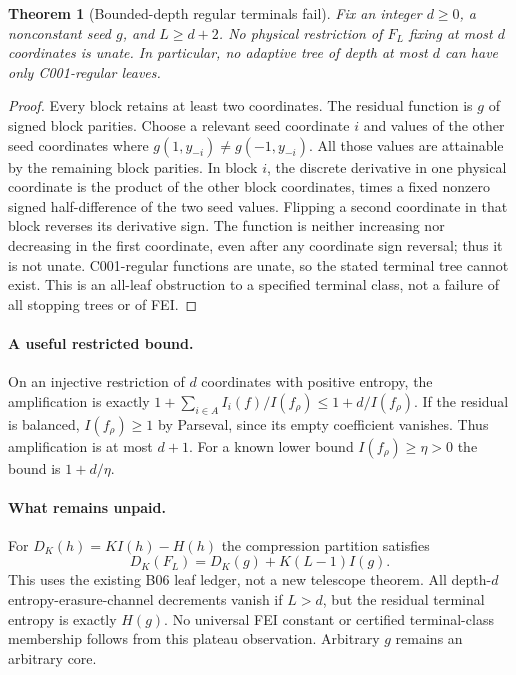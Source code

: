 \documentclass{article}
\newtheorem{theorem}{Theorem}
\begin{document}
\begin{theorem}[Bounded-depth regular terminals fail]
Fix an integer $d\ge0$, a nonconstant seed $g$, and $L\ge d+2$.
No physical restriction of $F_L$ fixing at most $d$ coordinates is
unate. In particular, no adaptive tree of depth at most $d$ can have
only C001-regular leaves.
\end{theorem}
\begin{proof}
Every block retains at least two coordinates. The residual function
is $g$ of signed block parities. Choose a relevant seed coordinate
$i$ and values of the other seed coordinates where
$g(1,y_{-i})\ne g(-1,y_{-i})$. All those values are attainable by the
remaining block parities. In block $i$, the discrete derivative in
one physical coordinate is the product of the other block coordinates,
times a fixed nonzero signed half-difference of the two seed values.
Flipping a second coordinate in that block reverses its derivative
sign. The function is neither increasing nor decreasing in the first
coordinate, even after any coordinate sign reversal; thus it is not
unate. C001-regular functions are unate, so the stated terminal tree
cannot exist. This is an all-leaf obstruction to a specified terminal
class, not a failure of all stopping trees or of FEI.
\end{proof}

\paragraph{A useful restricted bound.}
On an injective restriction of $d$ coordinates with positive entropy,
the amplification is exactly
$1+\sum_{i\in A} I_i(f)/I(f_\rho)\le1+d/I(f_\rho)$.
If the residual is balanced, $I(f_\rho)\ge1$ by Parseval, since its
empty coefficient vanishes. Thus amplification is at most $d+1$.
For a known lower bound $I(f_\rho)\ge\eta>0$ the bound is $1+d/\eta$.

\paragraph{What remains unpaid.}
For $D_K(h)=KI(h)-H(h)$ the compression partition satisfies
\[
 D_K(F_L)=D_K(g)+K(L-1)I(g).
\]
This uses the existing B06 leaf ledger, not a new telescope theorem.
All depth-$d$ entropy-erasure-channel decrements vanish if $L>d$,
but the residual terminal entropy is exactly $H(g)$. No universal FEI
constant or certified terminal-class membership follows from this
plateau observation. Arbitrary $g$ remains an arbitrary core.
\end{document}
